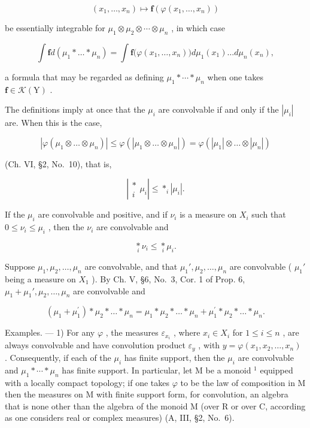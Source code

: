 \[
\left(x _ {1}, \dots , x _ {n}\right) \mapsto \mathbf {f} \left(\varphi \left(x _ {1}, \dots , x _ {n}\right)\right)
\]

be essentially integrable for \(\mu_{1}\otimes\mu_{2}\otimes\cdots\otimes\mu_{n}\) , in which case

\[
\int \mathbf {f} d (\mu_ {1} * \dots * \mu_ {n}) = \int \mathbf {f} \big (\varphi (x _ {1}, \ldots , x _ {n}) \big) d \mu_ {1} (x _ {1}) \ldots d \mu_ {n} (x _ {n}),\tag{1}
\]

a formula that may be regarded as defining \(\mu_{1}*\cdots *\mu_{n}\) when one takes \(\mathbf{f}\in\mathcal{K}(\mathrm{Y})\) .

The definitions imply at once that the \(\mu_{i}\) are convolvable if and only if the \(|\mu_{i}|\) are. When this is the case,

\[
\left| \varphi \left(\mu_ {1} \otimes \dots \otimes \mu_ {n}\right) \right| \leqslant \varphi \left(\left| \mu_ {1} \otimes \dots \otimes \mu_ {n} \right|\right) = \varphi \left(\left| \mu_ {1} \right| \otimes \dots \otimes \left| \mu_ {n} \right|\right)
\]

(Ch. VI, §2, No.~10), that is,

\[
\left| \begin{array}{c} * \\ i \end{array} \mu_ {i} \right| \leqslant * _ {i} | \mu_ {i} |.\tag{2}
\]

If the \(\mu_{i}\) are convolvable and positive, and if \(\nu_{i}\) is a measure on \(X_{i}\) such that \(0 \leqslant \nu_{i} \leqslant \mu_{i}\) , then the \(\nu_{i}\) are convolvable and

\[
\underset {i} {\ast} \nu_ {i} \leqslant \underset {i} {\ast} \mu_ {i}.
\]

Suppose \(\mu_1, \mu_2, \ldots, \mu_n\) are convolvable, and that \(\mu_1', \mu_2, \ldots, \mu_n\) are convolvable ( \(\mu_1'\) being a measure on \(X_1\) ). By Ch. V, §6, No.~3, Cor. 1 of Prop. 6, \(\mu_1 + \mu_1', \mu_2, \ldots, \mu_n\) are convolvable and

\[
\left(\mu_ {1} + \mu_ {1} ^ {\prime}\right) * \mu_ {2} * \dots * \mu_ {n} = \mu_ {1} * \mu_ {2} * \dots * \mu_ {n} + \mu_ {1} ^ {\prime} * \mu_ {2} * \dots * \mu_ {n}.
\]

Examples. --- 1) For any \(\varphi\) , the measures \(\varepsilon_{x_i}\) , where \(x_i \in X_i\) for \(1 \leqslant i \leqslant n\) , are always convolvable and have convolution product \(\varepsilon_y\) , with \(y = \varphi(x_1, x_2, \ldots, x_n)\) . Consequently, if each of the \(\mu_i\) has finite support, then the \(\mu_i\) are convolvable and \(\mu_1 * \cdots * \mu_n\) has finite support. In particular, let M be a monoid \(^1\) equipped with a locally compact topology; if one takes \(\varphi\) to be the law of composition in M then the measures on M with finite support form, for convolution, an algebra that is none other than the algebra of the monoid M (over R or over C, according as one considers real or complex measures) (A, III, §2, No.~6).

